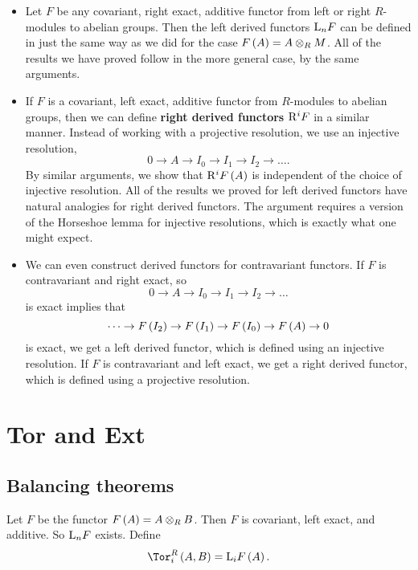 \begin{proposition}
\hfill
\begin{itemize}
\item Let $ F $ be any covariant, right exact, additive functor from left or right $ R $-modules to abelian groups. Then the left derived functors $ \mathrm{L}_nF $ can be defined in just the same way as we did for the case $ F\br{A} = A \otimes_R M $. All of the results we have proved follow in the more general case, by the same arguments.
\item If $ F $ is a covariant, left exact, additive functor from $ R $-modules to abelian groups, then we can define \textbf{right derived functors} $ \mathrm{R}^iF $ in a similar manner. Instead of working with a projective resolution, we use an injective resolution,
$$ 0 \to A \to I_0 \to I_1 \to I_2 \to \dots. $$
By similar arguments, we show that $ \R^iF\br{A} $ is independent of the choice of injective resolution. All of the results we proved for left derived functors have natural analogies for right derived functors. The argument requires a version of the Horseshoe lemma for injective resolutions, which is exactly what one might expect.
\item We can even construct derived functors for contravariant functors. If $ F $ is contravariant and right exact, so
$$ 0 \to A \to I_0 \to I_1 \to I_2 \to \dots $$
is exact implies that
$$ \dots \to F\br{I_2} \to F\br{I_1} \to F\br{I_0} \to F\br{A} \to 0 $$
is exact, we get a left derived functor, which is defined using an injective resolution. If $ F $ is contravariant and left exact, we get a right derived functor, which is defined using a projective resolution.
\end{itemize}
\end{proposition}

\pagebreak

\section{Tor and Ext}

\subsection{Balancing theorems}

\begin{definition}
Let $ F $ be the functor $ F\br{A} = A \otimes_R B $. Then $ F $ is covariant, left exact, and additive. So $ \mathrm{L}_nF $ exists. Define
$$ \Tor_i^R\br{A, B} = \L_iF\br{A}. $$
\end{definition}

